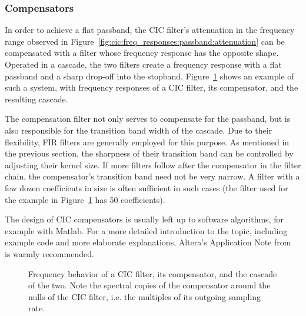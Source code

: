 \subsubsection{Compensators} %
\label{subsubsec:cic:compensators}

In     order      to     achieve     a     flat      passband,     the     CIC
filter's    attenuation     in    the    frequency    range     observed    in
Figure~\ref{fig:cic:freq_responses:passband:attenuation}  can  be  compensated
with a filter  whose frequency response has the opposite  shape. Operated in a
cascade, the two filters create a  frequency response with a flat passband and
a sharp drop-off into the stopband. Figure~\ref{fig:cic:cfir} shows an example
of such a  system, with frequency responses of a  CIC filter, its compensator,
and the resulting cascade.

The compensation filter not only serves to compensate for the passband, but is
also responsible  for the transition band  width of the cascade. Due  to their
flexibility, FIR filters are generally employed for this purpose. As mentioned
in  the previous  section,  the  sharpness of  their  transition  band can  be
controlled  by  adjusting their  kernel  size. If  more filters  follow  after
the  compensator  in  the  filter chain,  the  compensator's  transition  band
need  not be  very narrow. A  filter  with a  few dozen  coefficients in  size
is  often  sufficient in  such  cases  (the filter  used  for  the example  in
Figure~\ref{fig:cic:cfir} has \num{50} coefficients).

The design of CIC compensators is  usually left up to software algorithms, for
example with Matlab. For a more  detailed introduction to the topic, including
example  code  and  more  elaborate explanations,  Altera's  Application  Note
from~\cite{altera:an455} is warmly recommended.

\begin{figure}
    \centering
    
    \caption[CIC Compensator]{%
        Frequency behavior of  a CIC filter, its compensator,  and the cascade
        of the  two. Note the  spectral copies of  the compensator  around the
        nulls of the  CIC filter, i.e. the multiples of  its outgoing sampling
        rate.%
    }
    \label{fig:cic:cfir}
\end{figure}
%
%
